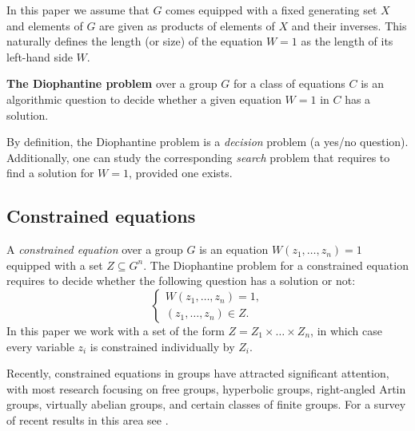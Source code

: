 \documentclass{jgcc}
\def\PSPACE{{\mathbf{PSPACE}}}
\begin{document}
In this paper we assume that $G$ comes equipped with a fixed generating set $X$
and elements of $G$ are given as products of elements of $X$ and their inverses.
This naturally defines the length (or size) of the equation $W=1$ as
the length of its left-hand side $W$.

\medskip\noindent
\textbf{The Diophantine problem} over a group $G$ for a class of equations $C$ 
is an algorithmic question to decide whether a given equation $W=1$
in $C$ has a solution. 

\medskip
By definition, the Diophantine problem is a \emph{decision} problem 
(a yes/no question).
Additionally, one can study the corresponding \emph{search} problem that requires
to find a solution for $W=1$, provided one exists.


\subsection{Constrained equations}


A \emph{constrained equation} over a group $G$ 
is an equation $W(z_1,\dots,z_n)=1$
equipped with a set $Z \subseteq G^n$.
The Diophantine problem for a constrained equation requires
to decide whether the following question has a solution or not:
$$
\left\{
\begin{array}{l}
W(z_1,\dots,z_n)=1,\\
(z_1,\dots,z_n)\in Z.
\end{array}
\right.
$$
In this paper we work with a set of the form $Z=Z_1\times\dots\times Z_n$, 
in which case every variable 
$z_i$ is constrained individually by $Z_i$.

Recently, constrained equations in groups have attracted significant attention, 
with most research focusing on free groups, hyperbolic groups, right-angled Artin 
groups, virtually abelian groups, and certain classes of finite groups.
For a survey of recent results in this area see \cite{Ciobanu:2024}.

\end{document}
